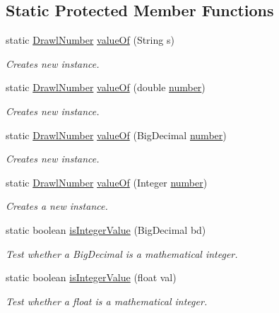 \subsection*{Static Protected Member Functions}
\begin{DoxyCompactItemize}
\item 
static \hyperlink{classcom_1_1aarrelaakso_1_1drawl_1_1_drawl_number}{Drawl\+Number} \hyperlink{classcom_1_1aarrelaakso_1_1drawl_1_1_drawl_number_a3fd17115c85e2bfc9e881838a3f7d735}{value\+Of} (String s)
\begin{DoxyCompactList}\small\item\em Creates new instance. \end{DoxyCompactList}\item 
static \hyperlink{classcom_1_1aarrelaakso_1_1drawl_1_1_drawl_number}{Drawl\+Number} \hyperlink{classcom_1_1aarrelaakso_1_1drawl_1_1_drawl_number_aae764e327a5a4006fcb863cd43c157d0}{value\+Of} (double \hyperlink{classcom_1_1aarrelaakso_1_1drawl_1_1_drawl_number_a9fe9f40163a4f5581b35d61ecf63f278}{number})
\begin{DoxyCompactList}\small\item\em Creates new instance. \end{DoxyCompactList}\item 
static \hyperlink{classcom_1_1aarrelaakso_1_1drawl_1_1_drawl_number}{Drawl\+Number} \hyperlink{classcom_1_1aarrelaakso_1_1drawl_1_1_drawl_number_afc0860879449c17f5410d0a1353d4e5b}{value\+Of} (Big\+Decimal \hyperlink{classcom_1_1aarrelaakso_1_1drawl_1_1_drawl_number_a9fe9f40163a4f5581b35d61ecf63f278}{number})
\begin{DoxyCompactList}\small\item\em Creates new instance. \end{DoxyCompactList}\item 
static \hyperlink{classcom_1_1aarrelaakso_1_1drawl_1_1_drawl_number}{Drawl\+Number} \hyperlink{classcom_1_1aarrelaakso_1_1drawl_1_1_drawl_number_a324b35d06d6b76c7b1cfe2eaba7115c7}{value\+Of} (Integer \hyperlink{classcom_1_1aarrelaakso_1_1drawl_1_1_drawl_number_a9fe9f40163a4f5581b35d61ecf63f278}{number})
\begin{DoxyCompactList}\small\item\em Creates a new instance. \end{DoxyCompactList}\item 
static boolean \hyperlink{classcom_1_1aarrelaakso_1_1drawl_1_1_drawl_number_ac3253122bbe3bc4946ea8fde1ff95cb4}{is\+Integer\+Value} (Big\+Decimal bd)
\begin{DoxyCompactList}\small\item\em Test whether a Big\+Decimal is a mathematical integer. \end{DoxyCompactList}\item 
static boolean \hyperlink{classcom_1_1aarrelaakso_1_1drawl_1_1_drawl_number_af27fcf1d898e54237f4b44ab0fecd24b}{is\+Integer\+Value} (float val)
\begin{DoxyCompactList}\small\item\em Test whether a float is a mathematical integer. \end{DoxyCompactList}\end{DoxyCompactItemize}
